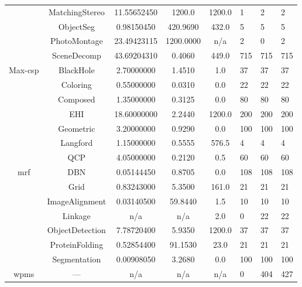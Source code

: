\begin{table}
\begin{tabu}{ccS[round-mode=places,round-precision=3]
					  S[round-mode=places,round-precision=0]
					  S[round-mode=places,round-precision=0]HHH}
	&	MatchingStereo\textdagger	&	11.55652450	&	1200.0	&	1200.0	&	1	&	2	&	2 \\
				&	ObjectSeg	&	0.98150450	&	420.9690	&	432.0	&	5	&	5	&	5 \\
				&	PhotoMontage	&	23.49423115	&	1200.0000	&	{n/a}	&	2	&	0	&	2 \\
				&	SceneDecomp	&	43.69204310	&	0.4060	&	449.0	&	715	&	715	&	715 \\
			Max-\acrshort{csp}	&	BlackHole	&	2.70000000	&	1.4510	&	1.0	&	37	&	37	&	37 \\
				&	Coloring	&	0.55000000	&	0.0310	&	0.0	&	22	&	22	&	22 \\
				&	Composed	&	1.35000000	&	0.3125	&	0.0	&	80	&	80	&	80 \\
				&	EHI	&	18.60000000	&	2.2440	&	1200.0	&	200	&	200	&	200 \\
				&	Geometric	&	3.20000000	&	0.9290	&	0.0	&	100	&	100	&	100 \\
				&	Langford	&	1.15000000	&	0.5555	&	576.5	&	4	&	4	&	4 \\
				&	QCP	&	4.05000000	&	0.2120	&	0.5	&	60	&	60	&	60 \\
			\acrshort{mrf}	&	DBN	&	0.05144450	&	0.8705	&	0.0	&	108	&	108	&	108 \\
				&	Grid	&	0.83243000	&	5.3500	&	161.0	&	21	&	21	&	21 \\
	&	ImageAlignment	&	0.03140500	&	59.8440	&	1.5	&	10	&	10	&	10 \\
	&	Linkage	&	{n/a}	&	{n/a}	&	2.0	&	0	&	22	&	22 \\
				&	ObjectDetection	&	7.78720400	&	5.9350	&	1200.0	&	37	&	37	&	37 \\
	&	ProteinFolding	&	0.52854400	&	91.1530	&	23.0	&	21	&	21	&	21 \\
				&	Segmentation	&	0.00908050	&	3.2680	&	0.0	&	100	&	100	&	100 \\
	\acrshort{wpms}	&	---	&	{n/a}	&	{n/a}	&	{n/a}	&	0	&	404	&	427 \\
		\bottomrule
	\end{tabu}
\end{table}
